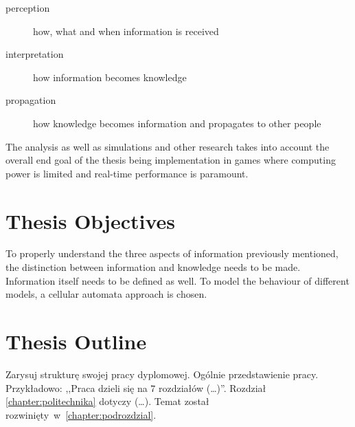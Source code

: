 \begin{description}
    \item[perception] how, what and when information is received
    \item[interpretation] how information becomes knowledge
    \item[propagation] how knowledge becomes information and propagates to other people
\end{description}

The analysis as well as simulations and other research takes into account the overall end goal of the thesis being implementation in games where computing power is limited and real-time performance is paramount.

\section{Thesis Objectives}
To properly understand the three aspects of information previously mentioned, the distinction between information and knowledge needs to be made.
Information itself needs to be defined as well.
To model the behaviour of different models, a cellular automata approach is chosen.

\section{Thesis Outline}
Zarysuj strukturę swojej pracy dyplomowej. Ogólnie przedstawienie pracy. Przykładowo: ,,Praca dzieli się na $7$ rozdziałów (\dots)''. Rozdział \ref{chapter:politechnika} dotyczy (\dots). Temat został rozwinięty~w~\ref{chapter:podrozdzial}.